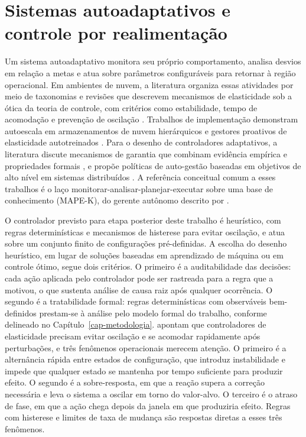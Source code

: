 \section{Sistemas autoadaptativos e controle por realimentação}
\label{sec-fund-adapt}

Um sistema autoadaptativo monitora seu próprio comportamento, analisa desvios em relação a metas e atua sobre parâmetros configuráveis para retornar à região operacional. Em ambientes de nuvem, a literatura organiza essas atividades por meio de taxonomias e revisões que descrevem mecanismos de elasticidade sob a ótica da teoria de controle, com critérios como estabilidade, tempo de acomodação e prevenção de oscilação \citep{ullah_control_elasticity_2018}. Trabalhos de implementação demonstram autoescala em armazenamentos de nuvem hierárquicos \citep{wu_anna_autoscale_2020} e gestores proativos de elasticidade autotreinados \citep{liu_onlineelastman_2017}. Para o desenho de controladores adaptativos, a literatura discute mecanismos de garantia que combinam evidência empírica e propriedades formais \citep{gambi_assurance_selfadaptive_2013}, e propõe políticas de auto-gestão baseadas em objetivos de alto nível em sistemas distribuídos \citep{rosa_selfmgmt_2013}. A referência conceitual comum a esses trabalhos é o laço monitorar-analisar-planejar-executar sobre uma base de conhecimento (MAPE-K), do gerente autônomo descrito por .

O controlador previsto para etapa posterior deste trabalho é heurístico, com regras determinísticas e mecanismos de histerese para evitar oscilação, e atua sobre um conjunto finito de configurações pré-definidas.  A escolha do desenho heurístico, em lugar de soluções baseadas em aprendizado de máquina ou em controle ótimo, segue dois critérios. O primeiro é a auditabilidade das decisões: cada ação aplicada pelo controlador pode ser rastreada para a regra que a motivou, o que sustenta análise de causa raiz após qualquer ocorrência. O segundo é a tratabilidade formal: regras determinísticas com observáveis bem-definidos prestam-se à análise pelo modelo formal do trabalho, conforme delineado no Capítulo~\ref{cap-metodologia}. \citet{ullah_control_elasticity_2018} apontam que controladores de elasticidade precisam evitar oscilação e se acomodar rapidamente após perturbações, e três fenômenos operacionais merecem atenção. O primeiro é a alternância rápida entre estados de configuração, que introduz instabilidade e impede que qualquer estado se mantenha por tempo suficiente para produzir efeito. O segundo é a sobre-resposta, em que a reação supera a correção necessária e leva o sistema a oscilar em torno do valor-alvo. O terceiro é o atraso de fase, em que a ação chega depois da janela em que produziria efeito. Regras com histerese e limites de taxa de mudança são respostas diretas a esses três fenômenos.

